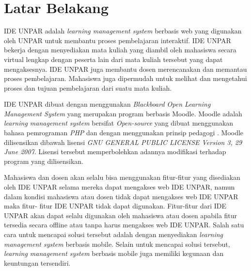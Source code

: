 \label{chap:intro}
   
\section{Latar Belakang}
\label{sec:label}

IDE UNPAR adalah \textit{learning management system} berbasis web yang digunakan oleh UNPAR untuk membantu proses pembelajaran interaktif. IDE UNPAR bekerja dengan menyediakan mata kuliah yang diambil oleh mahasiswa secara virtual lengkap dengan peserta lain dari mata kuliah tersebut yang dapat mengaksesnya. IDE UNPAR juga membantu dosen merencanakan dan memantau proses pembelajaran. Mahasiswa juga dipermudah untuk melihat dan mengetahui proses dan tujuan pembelajaran dari suatu mata kuliah. %

IDE UNPAR dibuat dengan menggunakan \textit{Blackboard Open Learning Management System} yang merupakan program berbasis Moodle. Moodle adalah \textit{learning management system} bersifat \textit{Open-source} yang dibuat menggunakan bahasa pemrograman \textit{PHP} dan dengan menggunakan prinsip pedagogi \cite{moodle:phil} . Moodle dilisensikan dibawah lisensi \textit{GNU GENERAL PUBLIC LICENSE Version 3, 29 June 2007}. Lisensi tersebut memperbolehkan adannya modifikasi terhadap program yang dilisensikan.

Mahasiswa dan dosen akan selalu bisa menggunakan fitur-fitur yang disediakan oleh IDE UNPAR selama mereka dapat mengakses web IDE UNPAR, namun dalam kondisi mahasiswa atau dosen tidak dapat mengakses web IDE UNPAR maka fitur- fitur IDE UNPAR tidak dapat digunakan. Fitur-fitur dari IDE UNPAR akan dapat selalu digunakan oleh mahasiswa atau dosen apabila fitur tersedia secara offline atau tanpa harus mengakses web IDE UNPAR. Salah satu cara untuk mencapai solusi tersebut adalah dengan menyediakan \textit{learning management system} berbasis  mobile. Selain untuk mencapai solusi tersebut, \textit{learning management system} berbasis mobile juga memiliki kegunaan dan keuntungan tersendiri\cite{mlms:stat}.

